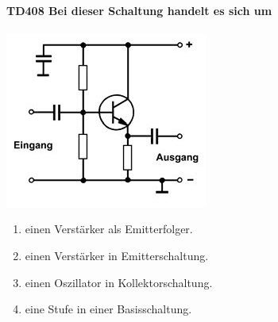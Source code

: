 \documentclass[8pt]{article}
\begin{document}
\begin{enumerate}
\begin{enumerate}[nolistsep,label=\Alph*]
\paragraph*{TD408 Bei dieser Schaltung handelt es sich um}
\begin{center}
	\begin{minipage}{\linewidth}
		\centering
		\includegraphics[scale=1.0]{pics/td408_a.jpg}
	\end{minipage}
\end{center}
\begin{enumerate}[nolistsep,label=\Alph*]
\item einen Verstärker als Emitterfolger.
\item einen Verstärker in Emitterschaltung.
\item einen Oszillator in Kollektorschaltung.
\item eine Stufe in einer Basisschaltung.
\end{enumerate}


\end{enumerate}
\end{enumerate}
\end{document}
